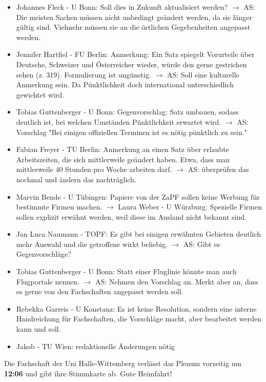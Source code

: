     \begin{itemize}
      \item Johannes Fleck - U Bonn: Soll dies in Zukunft aktualisiert werden? $\rightarrow$ AS: Die meisten Sachen müssen nicht unbedingt geändert werden, da sie länger gültig sind. Vielmehr müssen sie an die örtlichen Gegebenheiten angepasst werden.
      \item Jennifer Hartfiel - FU Berlin: Anmerkung: Ein Satz spiegelt Vorurteile über Deutsche, Schweizer und Österreicher wieder, würde den gerne gestrichen sehen (z. 319). Formulierung ist ungünstig. $\rightarrow$ AS: Soll eine kulturelle Anmerkung sein. Da Pünktlichkeit doch international unterschiedlich gewichtet wird.
      \item Tobias Guttenberger - U Bonn: Gegenvorschlag: Satz umbauen, sodass deutlich ist, bei welchen Umständen Pünktlichkeit erwartet wird. $\rightarrow$ AS: Vorschlag "Bei einigen offiziellen Terminen ist es nötig pünktlich zu sein."
      \item Fabian Freyer - TU Berlin: Anmerkung an einen Satz über erlaubte Arbeitszeiten, die sich mittlerweile geändert haben. Etwa, dass man mittlerweile 40 Stunden pro Woche arbeiten darf. $\rightarrow$ AS: überprüfen das nochmal und ändern das nachträglich.
      \item Marvin Bende - U Tübingen: Papiere von der ZaPF sollen keine Werbung für bestimmte Firmen machen. $\rightarrow$ Laura Weber - U Würzburg:  Spezielle Firmen sollen explizit erwähnt werden, weil diese im Ausland nicht bekannt sind.
      \item Jan Luca Naumann - TOPF: Es gibt bei einigen erwähnten Gebieten deutlich mehr Auswahl und die getroffene wirkt beliebig. $\rightarrow$ AS: Gibt es Gegenvorschläge?
      \item Tobias Guttenberger - U Bonn: Statt einer Fluglinie könnte man auch Flugportale nennen. $\rightarrow$ AS: Nehmen den Vorschlag an. Merkt aber an, dass es gerne von den Fachschaften angepasst werden soll.
      \item Rebekka Garreis - U Konstanz: Es ist keine Resolution, sondern eine interne Handreichung für Fachschaften, die Vorschläge macht, aber bearbeitet werden kann und soll.
      \item  Jakob - TU Wien: redaktionelle Änderungen nötig
    \end{itemize}

    \begin{info}{}
      Die Fachschaft der Uni Halle-Wittemberg verlässt das Plenum vorzeitig um \textbf{12:06} und gibt ihre Stimmkarte ab. Gute Heimfahrt!
    \end{info}

